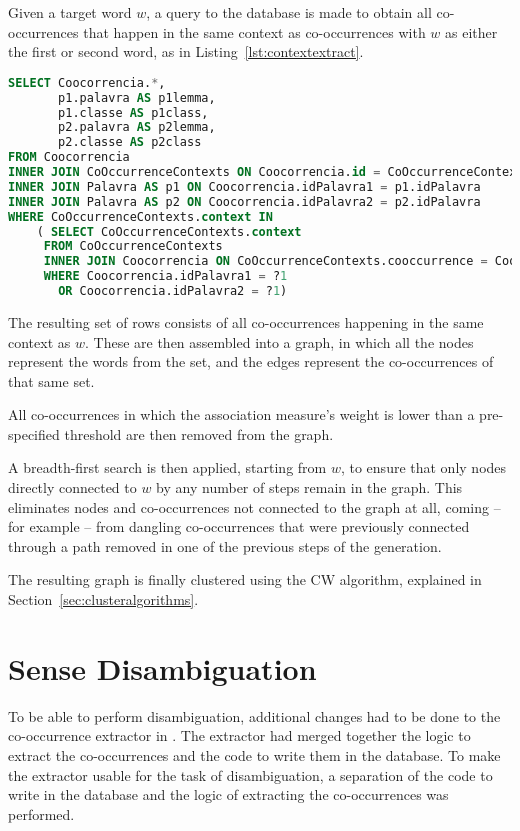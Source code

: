 Given a target word $w$, a query to the database is made to obtain all
co-occurrences that happen in the same context as co-occurrences with $w$ as
either the first or second word, as in Listing~\ref{lst:contextextract}.

\begin{lstlisting}[language=SQL,float=h,caption=SQL Query to extract all
co-occurrences in same context as the target word,label=lst:contextextract]
SELECT Coocorrencia.*,
       p1.palavra AS p1lemma,
       p1.classe AS p1class,
       p2.palavra AS p2lemma,
       p2.classe AS p2class
FROM Coocorrencia
INNER JOIN CoOccurrenceContexts ON Coocorrencia.id = CoOccurrenceContexts.cooccurrence
INNER JOIN Palavra AS p1 ON Coocorrencia.idPalavra1 = p1.idPalavra
INNER JOIN Palavra AS p2 ON Coocorrencia.idPalavra2 = p2.idPalavra
WHERE CoOccurrenceContexts.context IN
    ( SELECT CoOccurrenceContexts.context
     FROM CoOccurrenceContexts
     INNER JOIN Coocorrencia ON CoOccurrenceContexts.cooccurrence = Coocorrencia.id
     WHERE Coocorrencia.idPalavra1 = ?1
       OR Coocorrencia.idPalavra2 = ?1)
\end{lstlisting}

The resulting set of rows consists of all co-occurrences happening in the same
context as $w$. These are then assembled into a graph, in which all the nodes
represent the words from the set, and the edges represent the co-occurrences of
that same set.

All co-occurrences in which the association measure's weight is lower than a
pre-specified threshold are then removed from the graph.

A breadth-first search is then applied, starting from $w$, to ensure that only 
nodes directly connected to $w$ by any number of steps remain in the graph. This
eliminates nodes and co-occurrences not connected to the graph at all, coming
-- for example -- from dangling co-occurrences that were previously connected
through a path removed in one of the previous steps of the generation.

The resulting graph is finally clustered using the \ac{CW} algorithm, explained
in Section~\ref{sec:clusteralgorithms}.

\section{Sense Disambiguation}

To be able to perform disambiguation, additional changes had to be done to the
co-occurrence extractor in \citep{correia2015syntax}. The extractor had merged
together the logic to extract the co-occurrences and the code to write them in 
the database. To make the extractor usable for the task of disambiguation, a
separation of the code to write in the database and the logic of extracting the
co-occurrences was performed.

